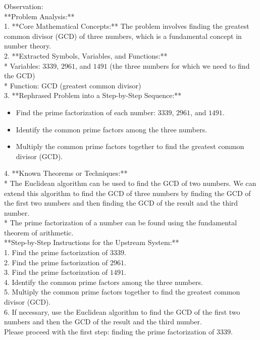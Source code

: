 \begin{tcolorbox}[colback=lightblue, colframe=black, arc=2pt, breakable, title=Understand Question Tool]
Observation:\\
**Problem Analysis:**\\

1. **Core Mathematical Concepts:** The problem involves finding the greatest common divisor (GCD) of three numbers, which is a fundamental concept in number theory.\\

2. **Extracted Symbols, Variables, and Functions:**\\
	* Variables: $3339$, $2961$, and $1491$ (the three numbers for which we need to find the GCD)\\
	* Function: GCD (greatest common divisor)\\
    
3. **Rephrased Problem into a Step-by-Step Sequence:**
\begin{itemize}[left=0pt]
    \item Find the prime factorization of each number: $3339$, $2961$, and $1491$.
    \item Identify the common prime factors among the three numbers.
    \item Multiply the common prime factors together to find the greatest common divisor (GCD).\\
\end{itemize}

4. **Known Theorems or Techniques:**\\
	* The Euclidean algorithm can be used to find the GCD of two numbers. We can extend this algorithm to find the GCD of three numbers by finding the GCD of the first two numbers and then finding the GCD of the result and the third number.\\
    
	* The prime factorization of a number can be found using the fundamental theorem of arithmetic.\\

**Step-by-Step Instructions for the Upstream System:**\\

1. Find the prime factorization of $3339$.\\
2. Find the prime factorization of $2961$.\\
3. Find the prime factorization of $1491$.\\
4. Identify the common prime factors among the three numbers.\\
5. Multiply the common prime factors together to find the greatest common divisor (GCD).\\
6. If necessary, use the Euclidean algorithm to find the GCD of the first two numbers and then the GCD of the result and the third number.\\

Please proceed with the first step: finding the prime factorization of $3339$.
\end{tcolorbox}

